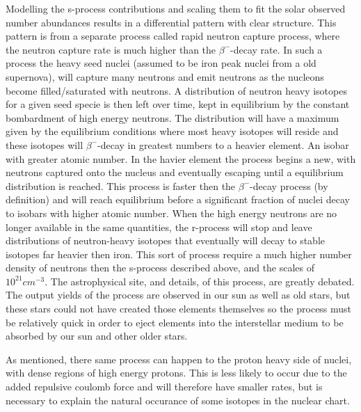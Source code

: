 Modelling the s-process contributions and scaling them to fit the solar observed number abundances results in a differential pattern with clear structure.
This pattern is from a separate process called rapid neutron capture process, where the neutron capture rate is much higher than the $\beta^-$-decay rate. In such a process the heavy seed nuclei (assumed to be iron peak nuclei from a old supernova), will capture many neutrons and emit neutrons as the nucleons become filled/saturated with neutrons. A distribution of neutron heavy isotopes for a given seed specie is then left over time, kept in equilibrium by the constant bombardment of high energy neutrons. The distribution will have a maximum given by the equilibrium conditions where most heavy isotopes will reside and these isotopes will $\beta^-$-decay in greatest numbers to a heavier element. An isobar with greater atomic number.
In the havier element the process begins a new, with neutrons captured onto the nucleus and eventually escaping until a equilibrium distribution is reached. This process is faster then the $\beta^-$-decay process (by definition) and will reach equilibrium before a significant fraction of nuclei decay to isobars with higher atomic number.
When the high energy neutrons are no longer available in the same quantities, the r-process will stop and leave distributions of neutron-heavy isotopes that eventually will decay to stable isotopes far heavier then iron.
This sort of process require a much higher number density of neutrons then the s-process described above, and the scales of $10^{21} cm^{-3}$.
The astrophysical site, and details, of this process, are greatly debated. The output yields of the process are observed in our sun as well as old stars, but these stars could not have created those elements themselves so the process must be relatively quick in order to eject elements into the interstellar medium to be absorbed by our sun and other older stars.

As mentioned, there same process can happen to the proton heavy side of nuclei, with dense regions of high energy protons. This is less likely to occur due to the added repulsive coulomb force and will therefore have smaller rates, but is necessary to explain the natural occurance of some isotopes in the nuclear chart.

\begin{figure}  
  \begin{minipage}{0.49\textwidth}
    
  \end{minipage}
  \begin{minipage}{0.49\textwidth}
    
    
  \end{minipage}
\end{figure}

\FloatBarrier
